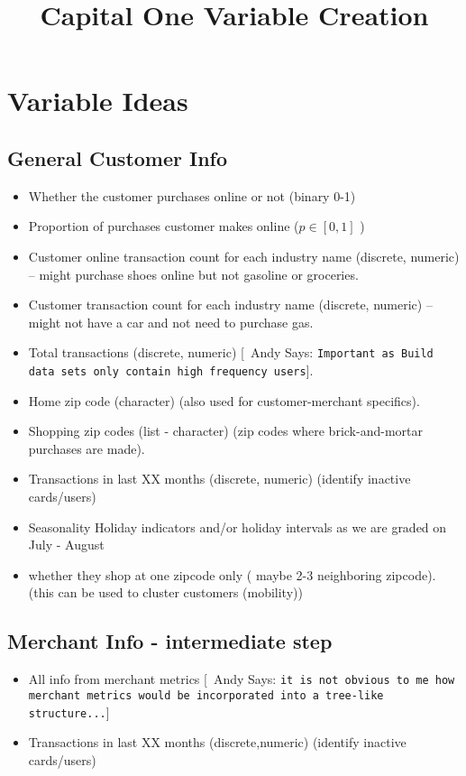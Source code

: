 \documentclass{article}
\begin{document}
  \title{\bf Capital One Variable Creation}

 \maketitle
\newcommand{\ac}[1]{[{\color{red}\ Andy Says: {\tt #1}}]}

\section{Variable Ideas}

\subsection{General Customer Info}
\begin{itemize}
\item Whether the customer purchases online or not (binary 0-1)
\item Proportion of purchases customer makes online ($p \in [0,1]$ )
\item Customer online transaction count for each industry name (discrete, numeric) -- might purchase shoes online but not gasoline or groceries.
\item Customer transaction count for each industry name (discrete, numeric) -- might not have a car and not need to purchase gas.
\item Total transactions  (discrete, numeric)  \ac{Important as Build data sets only contain high frequency users}.
\item Home zip code (character) (also used for customer-merchant specifics).
\item Shopping zip codes (list - character) (zip codes where brick-and-mortar purchases are made).
\item Transactions in last XX months (discrete, numeric) (identify inactive cards/users)
\item Seasonality Holiday indicators and/or holiday intervals as we are graded on July - August
\item whether they shop at one zipcode only ( maybe 2-3 neighboring zipcode). (this can be used to cluster customers (mobility))
\end{itemize}

\subsection{Merchant Info - intermediate step}
\begin{itemize}
\item All info from merchant metrics \ac{it is not obvious to me how merchant metrics would be incorporated into a tree-like structure...}
\item Transactions in last XX months (discrete,numeric) (identify inactive cards/users)
\end{itemize}
\end{document}
